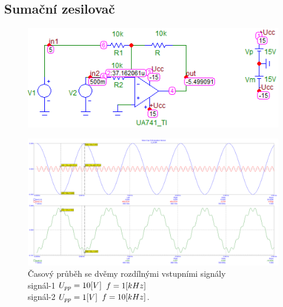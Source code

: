 \documentclass{article}
\begin{document}
\subsection*{Sumační zesilovač}
\begin{figure}[H]
  \begin{minipage}[t]{\textwidth}
    \includegraphics[width=\textwidth]{PC/ukol2/DC.png}
  \end{minipage}
\end{figure}

\begin{figure}[H]
  \begin{minipage}[t]{\textwidth}
    \centering
    \includegraphics[width=\textwidth]{PC/ukol2/transient2.png}
    Časový průběh se dvěmy rozdílnými vstupními signály \\
    signál-1 \(U_{pp} = 10\-[V]\) \(f = 1\-[kHz]\) \\
    signál-2 \(U_{pp} = 1\-[V]\) \(f = 10\-[kHz]\).
  \end{minipage}
\end{figure}
\end{document}
